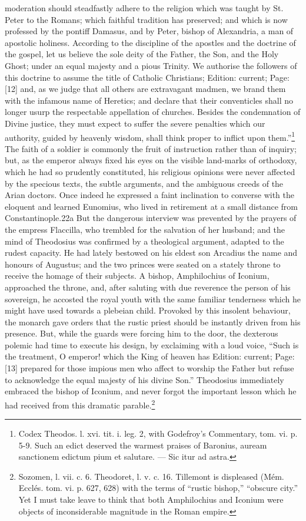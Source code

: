 moderation should steadfastly adhere to the religion which was taught by St. Peter to the Romans; which faithful tradition has preserved; and which is now professed by the pontiff Damasus, and by Peter, bishop of Alexandria, a man of apostolic holiness. According to the discipline of the apostles and the doctrine of the gospel, let us believe the sole deity of the Father, the Son, and the Holy Ghost; under an equal majesty and a pious Trinity. We authorise the followers of this doctrine to assume the title of Catholic Christians; Edition: current; Page: [12] and, as we judge that all others are extravagant madmen, we brand them with the infamous name of Heretics; and declare that their conventicles shall no longer usurp the respectable appellation of churches. Besides the condemnation of Divine justice, they must expect to suffer the severe penalties which our authority, guided by heavenly wisdom, shall think proper to inflict upon them.\texthebrew{}”\footnote{Codex Theodos. l. xvi. tit. i. leg. 2, with Godefroy\texthebrew{}’s Commentary, tom. vi. p. 5-9. Such an edict deserved the warmest praises of Baronius, auream sanctionem edictum pium et salutare. \texthebrew{—} Sic itur ad astra.} The faith of a soldier is commonly the fruit of instruction rather than of inquiry; but, as the emperor always fixed his eyes on the visible land-marks of orthodoxy, which he had so prudently constituted, his religious opinions were never affected by the specious texts, the subtle arguments, and the ambiguous creeds of the Arian doctors. Once indeed he expressed a faint inclination to converse with the eloquent and learned Eunomius, who lived in retirement at a small distance from Constantinople.22a But the dangerous interview was prevented by the prayers of the empress Flaccilla, who trembled for the salvation of her husband; and the mind of Theodosius was confirmed by a theological argument, adapted to the rudest capacity. He had lately bestowed on his eldest son Arcadius the name and honours of Augustus; and the two princes were seated on a stately throne to receive the homage of their subjects. A bishop, Amphilochius of Iconium, approached the throne, and, after saluting with due reverence the person of his sovereign, he accosted the royal youth with the same familiar tenderness which he might have used towards a plebeian child. Provoked by this insolent behaviour, the monarch gave orders that the rustic priest should be instantly driven from his presence. But, while the guards were forcing him to the door, the dexterous polemic had time to execute his design, by exclaiming with a loud voice, \texthebrew{“}Such is the treatment, O emperor! which the King of heaven has Edition: current; Page: [13] prepared for those impious men who affect to worship the Father but refuse to acknowledge the equal majesty of his divine Son.\texthebrew{}” Theodosius immediately embraced the bishop of Iconium, and never forgot the important lesson which he had received from this dramatic parable.\footnote{Sozomen, l. vii. c. 6. Theodoret, l. v. c. 16. Tillemont is displeased (Mém. Ecclés. tom. vi. p. 627, 628) with the terms of \texthebrew{“}rustic bishop,\texthebrew{” “}obscure city.\texthebrew{}” Yet I must take leave to think that both Amphilochius and Iconium were objects of inconsiderable magnitude in the Roman empire.}

